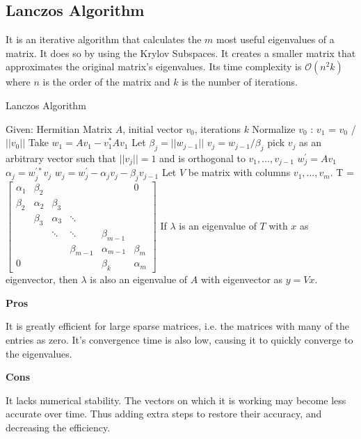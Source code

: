 \documentclass{article}
\begin{document}
\subsection{Lanczos Algorithm}
It is an iterative algorithm that calculates the $m$ most useful eigenvalues of a matrix. It does so by using the Krylov Subspaces. It creates a smaller matrix that approximates the original matrix's eigenvalues. Its time complexity is $\mathcal{O}(n^2k)$ where $n$ is the order of the matrix and $k$ is the number of iterations.

\begin{algorithm}[H]
    \caption{Lanczos Algorithm}
    \begin{algorithmic}[1]
    \Statex Given: Hermitian Matrix $A$, initial vector $v_0$, iterations $k$
    \State Normalize $v_0$ : $v_1$ = $v_0$ / $||v_0||$
    \State Take $w_1 = Av_1 - v_1^*Av_1$ 
        \State Let $\beta_j = ||w_{j-1}||$
            \State $v_j = w_{j-1} / \beta_j$
        \Else
            \State pick $v_j$ as an arbitrary vector such that $||v_j|| =1$ and is orthogonal to $v_1, \ldots, v_{j-1}$
        \EndIf
        \State $w_j^{\prime}= Av_1$
        \State $\alpha_j = w_j^{\prime*} v_j$
        \State $w_j = w_j^{\prime} - \alpha_jv_j - \beta_j v_{j-1}$
    \EndFor
    \State Let $V$ be matrix with columns $v_1, \ldots, v_m$. T = 
    $\begin{bmatrix}
        \alpha_1 & \beta_2  & & & & 0 \\
        \beta_2 & \alpha_2 & \beta_3 &&&\\
        &\beta_3&\alpha_3&\ddots&&\\
        &&\ddots&\ddots&\beta_{m-1}&\\
        &&&\beta_{m-1}&\alpha_{m-1}&\beta_m\\
        0&&&&\beta_k&\alpha_m
    \end{bmatrix}$
    \State If $\lambda$ is an eigenvalue of $T$ with $x$ as eigenvector, then $\lambda$ is also an eigenvalue of $A$ with eigenvector as $y = Vx$.
    
    \end{algorithmic}
\end{algorithm}
\begin{multicols}{2}
\begin{center}\textbf{Pros}\end{center}
It is greatly efficient for large sparse matrices, i.e. the matrices with many of the entries as zero. It's convergence time is also low, causing it to quickly converge to the eigenvalues.
\columnbreak
\begin{center}\textbf{Cons}\end{center}
It lacks numerical stability. The vectors on which it is working may become less accurate over time. Thus adding extra steps to restore their accuracy, and decreasing the efficiency.
\end{multicols}
\end{document}
